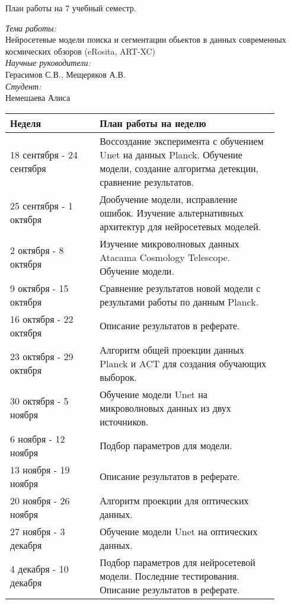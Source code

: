 \documentclass{article}
\begin{document}
\begin{center}
{\huge План работы на 7 учебный семестр.}\\
\end{center}
\textit{Тема работы:}\\
Нейросетевые модели поиска и сегментации обьектов в данных современных космических обзоров (eRosita, ART-XC)\\
\textit{Научные руководители:}\\
Герасимов С.В., Мещеряков А.В.\\
\textit{Студент:}\\
Немешаева Алиса\\
    \begin{table}[h!]
        \begin{tabular}{|p{0.3\linewidth}|p{0.6\linewidth}|}
            \hline
            \textbf{Неделя} & \textbf{План работы на неделю}\\
            \hline
            18 сентября - 24 сентября & Воссоздание эксперимента с обучением Unet на данных 
                Planck. Обучение модели, создание алгоритма детекции, сравнение результатов.\\ 
            25 сентября - 1 октября & Дообучение модели, исправление ошибок. Изучение альтернативных 
                архитектур для нейросетевых моделей. \\
        \hline
            2 октября - 8 октября & Изучение микроволновых данных Atacama Cosmology Telescope. 
                Обучение модели. \\
            9 октября - 15 октября & Сравнение результатов новой модели с результами работы по 
                данным Planck.\\
            16 октября - 22 октября & Описание результатов в реферате.\\
        \hline
            23 октября - 29 октября & Алгоритм общей проекции данных Planck и ACT для создания 
                обучающих выборок.\\
            30 октября - 5 ноября & Обучение модели Unet на микроволновых данных из двух источников.\\
            6 ноября - 12 ноября & Подбор параметров для модели. \\
            13 ноября - 19 ноября & Описание результатов в реферате.\\
        \hline
            20 ноября - 26 ноября & Алгоритм проекции для оптических данных.\\
            27 ноября - 3 декабря & Обучение модели Unet на оптических данных.\\
            4 декабря - 10 декабря & Подбор параметров для нейросетевой модели. 
                Последние тестирования. Описание результатов в реферате.\\
            \hline
        \end{tabular}
    \end{table}
\end{document}
